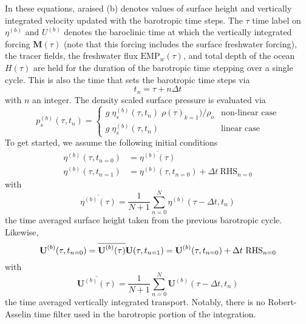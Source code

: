 \documentclass[../tex_main/NEMO_manual]{subfiles}
\begin{document}
In these equations, araised (b) denotes values of surface height and vertically integrated velocity updated with the barotropic time steps. The $\tau$ time label on $\eta^{(b)}$ 
and $U^{(b)}$ denotes the baroclinic time at which the vertically integrated forcing $\textbf{M}(\tau)$ (note that this forcing includes the surface freshwater forcing), the tracer fields, the freshwater flux $\text{EMP}_w(\tau)$, and total depth of the ocean $H(\tau)$ are held for the duration of the barotropic time stepping over a single cycle. This is also the time 
that sets the barotropic time steps via 
\begin{equation} \label{eq:DYN_spg_ts_t}
t_n=\tau+n\Delta t   
\end{equation}
with $n$ an integer. The density scaled surface pressure is evaluated via 
\begin{equation} \label{eq:DYN_spg_ts_ps}
p_s^{(b)}(\tau,t_{n}) = \begin{cases}
	g \;\eta_s^{(b)}(\tau,t_{n}) \;\rho(\tau)_{k=1}) / \rho_o  &      \text{non-linear case} \\
	g \;\eta_s^{(b)}(\tau,t_{n})  &      \text{linear case} 
	\end{cases}
\end{equation}
To get started, we assume the following initial conditions 
\begin{equation} \label{eq:DYN_spg_ts_eta}
\begin{split}
\eta^{(b)}(\tau,t_{n=0}) &= \overline{\eta^{(b)}(\tau)}
\\
\eta^{(b)}(\tau,t_{n=1}) &= \eta^{(b)}(\tau,t_{n=0}) + \Delta t \ \text{RHS}_{n=0} 
\end{split}
\end{equation}
with 
\begin{equation} \label{eq:DYN_spg_ts_etaF}
 \overline{\eta^{(b)}(\tau)} = \frac{1}{N+1} \sum\limits_{n=0}^N \eta^{(b)}(\tau-\Delta t,t_{n})
\end{equation}
the time averaged surface height taken from the previous barotropic cycle. Likewise, 
\begin{equation} \label{eq:DYN_spg_ts_u}
\textbf{U}^{(b)}(\tau,t_{n=0}) = \overline{\textbf{U}^{(b)}(\tau)}	\\
\\
\textbf{U}(\tau,t_{n=1}) = \textbf{U}^{(b)}(\tau,t_{n=0}) + \Delta t \ \text{RHS}_{n=0}  	
\end{equation}
with 
\begin{equation} \label{eq:DYN_spg_ts_u}
 \overline{\textbf{U}^{(b)}(\tau)} 
 	= \frac{1}{N+1} \sum\limits_{n=0}^N\textbf{U}^{(b)}(\tau-\Delta t,t_{n})
\end{equation}
the time averaged vertically integrated transport. Notably, there is no Robert-Asselin time filter used in the barotropic portion of the integration. 
\end{document}

